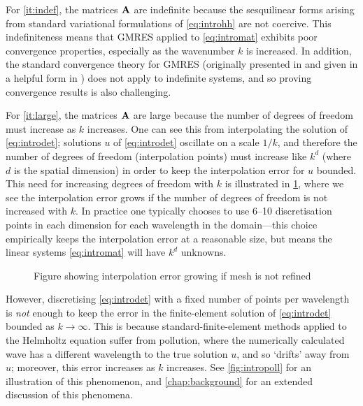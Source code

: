     For \cref{it:indef}, the matrices $\mathbf{A}$ are indefinite because the sesquilinear forms arising from standard variational formulations of \eqref{eq:introhh} are not coercive. This indefiniteness means that GMRES applied to \eqref{eq:intromat} exhibits poor convergence properties, especially as the wavenumber $k$ is increased. In addition, the standard convergence theory for GMRES (originally presented in \cite{El:82} and given in a helpful form in \cite[Equation (1.1)]{BeGoTy:06}) does not apply to indefinite systems, and so proving convergence results is also challenging.
    
For \cref{it:large}, the matrices $\mathbf{A}$ are large because the number of degrees of freedom must increase as $k$ increases. One can see this from interpolating the solution of \eqref{eq:introdet}; solutions $u$ of \eqref{eq:introdet} oscillate on a scale $1/k$, and therefore the number of degrees of freedom (interpolation points) must increase like $k^d$ (where $d$ is the spatial dimension) in order to keep the interpolation error for $u$ bounded. This need for increasing degrees of freedom with $k$ is illustrated in \cref{fig:introinterp}, where we see the interpolation error grows if the number of degrees of freedom is not increased with $k$. In practice one typically chooses to use 6--10 discretisation points in each dimension for each wavelength in the domain---this choice  empirically keeps the interpolation error at a reasonable size, but means the linear systems \eqref{eq:intromat} will have $k^d$ unknowns. 

\begin{figure}
\caption{\label{fig:introinterp} Figure showing interpolation error growing if mesh is not refined}
\end{figure}

However, discretising \eqref{eq:introdet} with a fixed number of points per wavelength is \emph{not} enough to keep the error in the finite-element solution of \eqref{eq:introdet} bounded as $k\rightarrow \infty.$ This is because standard-finite-element methods applied to the Helmholtz equation suffer from pollution, where the numerically calculated wave has a different wavelength to the true solution $u$, and so `drifts' away from $u$; moreover, this error increases as $k$ increases. See \cref{fig:intropoll} for an illustration of this phenomenon, and \cref{chap:background} for an extended discussion of this phenomena.

